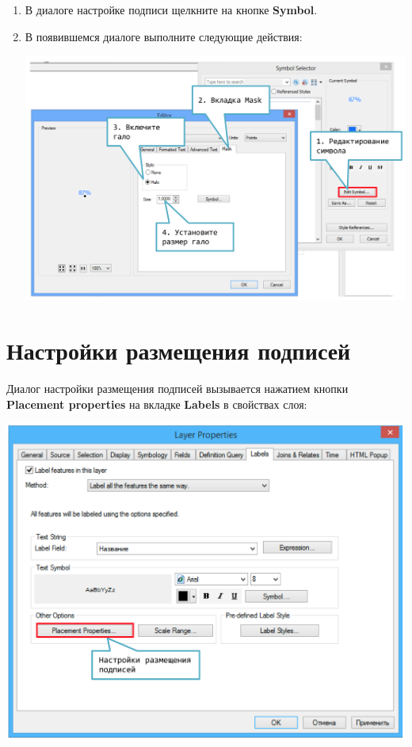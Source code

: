 \documentclass[]{book}
\theoremstyle{definition}
\theoremstyle{definition}
\theoremstyle{definition}
\theoremstyle{remark}
\begin{document}
\begin{enumerate}
\def\labelenumi{\arabic{enumi}.}
\item
  В диалоге настройке подписи щелкните на кнопке \textbf{Symbol}.
\item
  В появившемся диалоге выполните следующие действия:

  \includegraphics{images/Appendix/image42.png}
\end{enumerate}

\hypertarget{--}{%
\section{Настройки размещения подписей}\label{--}}

Диалог настройки размещения подписей вызывается нажатием кнопки
\textbf{Placement properties} на вкладке \textbf{Labels} в свойствах
слоя:

\includegraphics{images/Appendix/image43.png}
\end{document}
